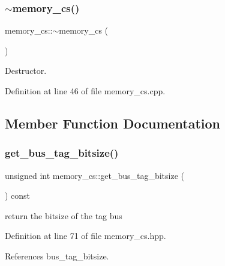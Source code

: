 \mbox{\label{classmemory__cs_a380ae0b25722fddb38538e1db98e003c}} 
\subsubsection{\texorpdfstring{$\sim$memory\+\_\+cs()}{~memory\_cs()}}
{\footnotesize\ttfamily memory\+\_\+cs\+::$\sim$memory\+\_\+cs (\begin{DoxyParamCaption}{ }\end{DoxyParamCaption})\hspace{0.3cm}{\ttfamily [virtual]}}



Destructor. 



Definition at line 46 of file memory\+\_\+cs.\+cpp.



\subsection{Member Function Documentation}
\mbox{\label{classmemory__cs_ab4f7406402085794bdc30bddd803a5ce}} 
\subsubsection{\texorpdfstring{get\+\_\+bus\+\_\+tag\+\_\+bitsize()}{get\_bus\_tag\_bitsize()}}
{\footnotesize\ttfamily unsigned int memory\+\_\+cs\+::get\+\_\+bus\+\_\+tag\+\_\+bitsize (\begin{DoxyParamCaption}{ }\end{DoxyParamCaption}) const\hspace{0.3cm}{\ttfamily [inline]}}



return the bitsize of the tag bus 



Definition at line 71 of file memory\+\_\+cs.\+hpp.



References bus\+\_\+tag\+\_\+bitsize.

